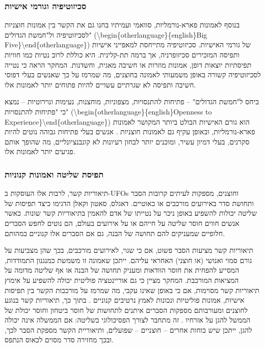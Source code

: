 \documentclass[12pt,a4paper]{article}
\begin{document}
\subsubsection{סכיזוטיפיה וגורמי אישיות}
בנוסף לאמונות פארא-נורמליות, סוואמי ועמיתיו \cite{Swami2009} בחנו גם את הקשר בין אמונות חוצניות לסכיזוטיפיה ול"חמשת הגדולים" (\textbackslash{}begin\{otherlanguage\}\{english\}Big Five\}\textbackslash{}end\{otherlanguage\}) של גורמי האישיות. סכיזוטיפיה מתייחסת למאפייני אישיות ותפיסה המזכירים סכיזופרניה, אך ברמה תת-קלינית. היא כוללת לרוב נטיות כמו חוויות תפיסתיות יוצאות דופן, אמונות מוזרות או חשיבה מאגית, וחשדנות. המחקר הראה כי נטייה לסכיזוטיפיה קשורה באופן משמעותי לאמונה בחוצנים, מה שמרמז על כך שאנשים בעלי דפוסי חשיבה ותפיסה לא שגרתיים עשויים להיות פתוחים יותר לאמונות אלו.

ביחס ל"חמשת הגדולים" – פתיחות להתנסויות, מצפוניות, מוחצנות, נעימות ונוירוטיות – נמצא כי "פתיחות להתנסויות" (\textbackslash{}begin\{otherlanguage\}\{english\}Openness to Experience\}\textbackslash{}end\{otherlanguage\}) הוא גורם האישיות הבולט ביותר המקושר לאמונות פארא-נורמליות, ובאופן עקיף גם לאמונות חוצניות \cite{Swami2009}. אנשים בעלי פתיחות גבוהה נוטים להיות סקרנים, בעלי דמיון עשיר, ומוכנים יותר לבחון רעיונות לא קונבנציונליים, מה שהופך אותם פגיעים יותר לאמונות אלו.

\subsubsection{תפיסת שליטה ואמונות קנוניות}
תיאוריות קשר, לרבות אלו העוסקות ב-UFOs וחוצנים, מספקות לעיתים קרובות הסבר ותחושת סדר באירועים מורכבים או כאוטיים. דאגלס, סאטון וקאלן \cite{Douglas2015} הדגימו כיצד תפיסות של שליטה יכולות להשפיע באופן ניכר על נטייתו של אדם להאמין בתיאוריות קשר שונות. כאשר אנשים חווים חוסר שליטה על חייהם או על אירועים בעולם, הם נוטים לחפש הסברים חלופיים שמעניקים להם תחושה של הבנה, גם אם הסברים אלו קנוניים במהותם.

תיאוריות קשר מציעות הסבר פשוט, אם כי שגוי, לאירועים מורכבים, בכך שהן מצביעות על גורם סמוי ואנושי (או חוצני) האחראי עליהם. ייתכן שאמונה זו משמשת כמנגנון התמודדות, המסייע להפחית את חוסר הוודאות ומעניק תחושה של הבנה או אף שליטה מדומה על המציאות המורכבת. המחקר מציין כי גם אוריינטציה פוליטית יכולה להשפיע על אימוץ תיאוריות קשר מסוימות, אם כי באופן שאינו עקבי, מה שמרמז על מורכבות הקשר בין תפיסות אישיות, אמונות פוליטיות ונכונות לאמץ נרטיבים קנוניים \cite{Douglas2015}. בתוך כך, תיאוריות קשר בנוגע לחוצנים ומעורבותם מספקות הסברים איתנים לתחושות של חוסר ביטחון וחוסר יכולת של הממשל להגן על אזרחיו \cite{UnknownAbduction}. זה מתחבר לצורך הפסיכולוגי בשליטה: אם הממשלה אינה יכולה להגן, ייתכן שיש כוחות אחרים – חוצניים – שפועלים, ותיאוריית הקשר מספקת הסבר לכך, ובכך מחזירה סדר מסוים לכאוס הנתפס.
\end{document}
